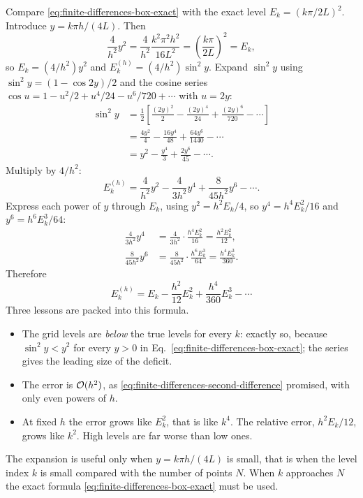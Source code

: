 Compare \eqref{eq:finite-differences-box-exact} with the exact level $E_k=(k\pi/2L)^2$. Introduce $y=k\pi h/(4L)$. Then
\begin{equation*}
\frac{4}{h^2}y^2=\frac{4}{h^2}\frac{k^2\pi^2h^2}{16L^2}=\left(\frac{k\pi}{2L}\right)^2=E_k,
\end{equation*}
so $E_k=(4/h^2)y^2$ and $E_k^{(h)}=(4/h^2)\sin^2y$. Expand $\sin^2y$ using $\sin^2y=(1-\cos2y)/2$ and the cosine series $\cos u=1-u^2/2+u^4/24-u^6/720+\cdots$ with $u=2y$:
\begin{align*}
\sin^2y&=\frac12\left[\frac{(2y)^2}{2}-\frac{(2y)^4}{24}+\frac{(2y)^6}{720}-\cdots\right]\\
&=\frac{4y^2}{4}-\frac{16y^4}{48}+\frac{64y^6}{1440}-\cdots\\
&=y^2-\frac{y^4}{3}+\frac{2y^6}{45}-\cdots.
\end{align*}
Multiply by $4/h^2$:
\begin{equation*}
E_k^{(h)}=\frac{4}{h^2}y^2-\frac{4}{3h^2}y^4+\frac{8}{45h^2}y^6-\cdots.
\end{equation*}
Express each power of $y$ through $E_k$, using $y^2=h^2E_k/4$, so $y^4=h^4E_k^2/16$ and $y^6=h^6E_k^3/64$:
\begin{align*}
\frac{4}{3h^2}y^4&=\frac{4}{3h^2}\cdot\frac{h^4E_k^2}{16}=\frac{h^2E_k^2}{12},\\
\frac{8}{45h^2}y^6&=\frac{8}{45h^2}\cdot\frac{h^6E_k^3}{64}=\frac{h^4E_k^3}{360}.
\end{align*}
Therefore
\begin{equation}
\boxed{\;E_k^{(h)}=E_k-\frac{h^2}{12}E_k^2+\frac{h^4}{360}E_k^3-\cdots\;}
\label{eq:finite-differences-box-expansion}
\end{equation}
Three lessons are packed into this formula.
\begin{itemize}
\item The grid levels are \emph{below} the true levels for every $k$: exactly so, because $\sin^2y<y^2$ for every $y>0$ in Eq.~\eqref{eq:finite-differences-box-exact}; the series gives the leading size of the deficit.
\item The error is $\mathcal{O}(h^2)$, as \eqref{eq:finite-differences-second-difference} promised, with only even powers of $h$.
\item At fixed $h$ the error grows like $E_k^2$, that is like $k^4$. The relative error, $h^2E_k/12$, grows like $k^2$. High levels are far worse than low ones.
\end{itemize}
The expansion is useful only when $y=k\pi h/(4L)$ is small, that is when the level index $k$ is small compared with the number of points $N$. When $k$ approaches $N$ the exact formula \eqref{eq:finite-differences-box-exact} must be used.

